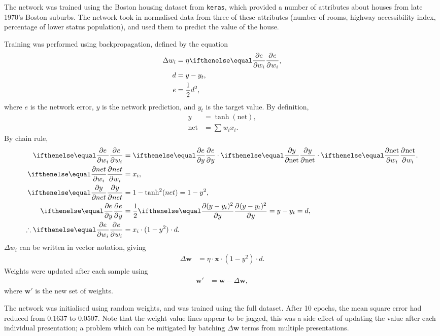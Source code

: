 The network was trained using the Boston housing dataset from \texttt{keras},
which provided a number of attributes about houses from late 1970's Boston
suburbs.
The network took in normalised data from three of these attributes (number of
rooms, highway accessibility index, percentage of lower status population), and
used them to predict the value of the house.

Training was performed using backpropagation, defined by the equation
\begin{align*}
    \Delta w_i &= \eta\Rpdiff{e}{w_i},\\
    d &= y - y_t,\\
    e &= \frac{1}{2}d^2,
\end{align*}
where $e$ is the network error, $y$ is the network prediction, and $y_t$ is the
target value.
By definition,
\begin{align*}
    y &= \tanh(\text{net}),\\
    \text{net} &= \sum w_ix_i.
\end{align*}
By chain rule,
\begin{align*}
    \Rpdiff{e}{w_i} &=
    \Rpdiff{e}{y} \cdot \Rpdiff{y}{\text{net}} \cdot \Rpdiff{\text{net}}{w_i}.\\
    \Rpdiff{net}{w_i} &= x_i,\\
    \Rpdiff{y}{net} &= 1 - \tanh^2(net) = 1 - y^2,\\
    \Rpdiff{e}{y} &= \frac{1}{2}\Rpdiff{(y - y_t)^2}{y} = y - y_t = d,\\
    \therefore\Rpdiff{e}{w_i} &=
    x_i \cdot (1 - y^2) \cdot d.
\end{align*}
$\Delta w_i$ can be written in vector notation, giving
\begin{align*}
    \Delta \mathbf{w} &= \eta\cdot\mathbf{x}\cdot (1-y^2)\cdot d.
\end{align*}
Weights were updated after each sample using
\begin{align*}
    \mathbf{w}' &= \mathbf{w} - \Delta\mathbf{w},
\end{align*}
where $\mathbf{w}'$ is the new set of weights.

The network was initialised using random weights, and was trained using the full
dataset.
After 10 epochs, the mean square error had reduced from 0.1637 to 0.0507.
Note that the weight value lines appear to be jagged, this was a side effect of
updating the value after each individual presentation; a problem which can be
mitigated by batching $\Delta\mathbf{w}$ terms from multiple presentations.



